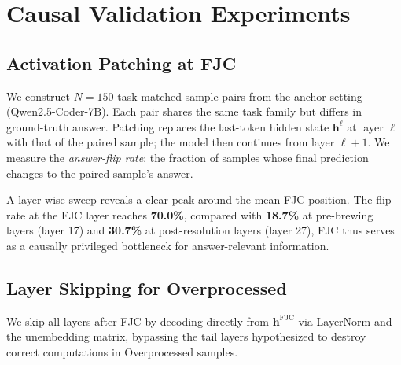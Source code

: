 
\section{Causal Validation Experiments}
\label{app:causal_validation_details}

\subsection{Activation Patching at FJC}
\label{app:subsec:activation_patching_fjc}

We construct $N=150$ task-matched sample pairs from the anchor setting (Qwen2.5-Coder-7B).
Each pair shares the same task family but differs in ground-truth answer.
Patching replaces the last-token hidden state $\mathbf{h}^\ell$ at layer $\ell$ with that of the paired sample; the model then continues from layer $\ell+1$.
We measure the \emph{answer-flip rate}: the fraction of samples whose final prediction changes to the paired sample's answer.

A layer-wise sweep reveals a clear peak around the mean FJC position.
The flip rate at the FJC layer reaches \textbf{70.0\%}, compared with \textbf{18.7\%} at pre-brewing layers (layer 17) and \textbf{30.7\%} at post-resolution layers (layer 27), FJC thus serves as a causally privileged bottleneck for answer-relevant information.

\subsection{Layer Skipping for Overprocessed}
\label{app:subsec:layer_skipping_overprocessed}

We skip all layers after FJC by decoding directly from $\mathbf{h}^{\mathrm{FJC}}$ via LayerNorm and the unembedding matrix, bypassing the tail layers hypothesized to destroy correct computations in Overprocessed samples.

\begin{table}[H]
\centering
\caption{Layer-skipping results by outcome group. Pre-skip accuracy is the standard model accuracy; post-skip accuracy is obtained by decoding from $\mathbf{h}^{\mathrm{FJC}}$.}
\label{tab:app:layer_skipping}
\end{table}

